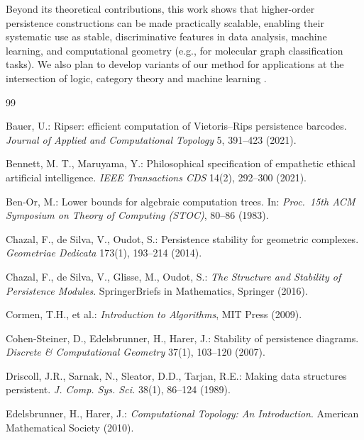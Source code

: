 \documentclass[runningheads]{llncs}
\begin{document}
Beyond its theoretical contributions, this work shows that higher-order 
persistence constructions can be made practically scalable, enabling their systematic use as stable, discriminative features in data analysis, machine learning, and computational geometry (e.g., for molecular graph classification tasks). We also plan to develop variants of our method for applications at the intersection of logic, category theory and machine learning \cite{Mar09,Mar10,Mar12,Mar13a,Mar13b,Mar20a,Mar20b,BM21}.








\begin{thebibliography}{99}

Bauer, U.:
\newblock Ripser: efficient computation of Vietoris--Rips persistence barcodes.
\newblock \emph{Journal of Applied and Computational Topology} 5, 391--423 (2021).

Bennett, M. T., Maruyama, Y.:
\newblock Philosophical specification of empathetic ethical artificial intelligence.
\newblock \emph{IEEE Transactions CDS} 14(2), 292--300 (2021).

Ben-Or, M.:
\newblock Lower bounds for algebraic computation trees.
\newblock In: \emph{Proc.\ 15th ACM Symposium on Theory of Computing (STOC)}, 80--86 (1983).

Chazal, F., de Silva, V., Oudot, S.:
\newblock Persistence stability for geometric complexes.
\newblock \emph{Geometriae Dedicata} 173(1), 193--214 (2014).

Chazal, F., de Silva, V., Glisse, M., Oudot, S.:
\newblock \emph{The Structure and Stability of Persistence Modules}.
\newblock SpringerBriefs in Mathematics, Springer (2016).

Cormen, T.H., et al.:
\newblock \emph{Introduction to Algorithms}, 
\newblock MIT Press (2009).

Cohen-Steiner, D., Edelsbrunner, H., Harer, J.:
\newblock Stability of persistence diagrams.
\newblock \emph{Discrete \& Computational Geometry} 37(1), 103--120 (2007).

Driscoll, J.R., Sarnak, N., Sleator, D.D., Tarjan, R.E.:
\newblock Making data structures persistent.
\newblock \emph{J. Comp. Sys. Sci.} 38(1), 86--124 (1989).

Edelsbrunner, H., Harer, J.:
\newblock \emph{Computational Topology: An Introduction}.
\newblock American Mathematical Society (2010).


\end{thebibliography}
\end{document}
